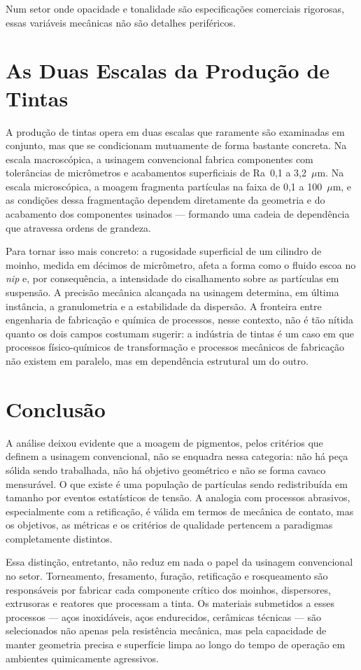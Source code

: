 \documentclass[
  12pt,
  a4paper,
  oneside,
  brazil,
  chapter=TITLE
]{article}
\newcommand{\secbreak}{\clearpage}
\let\oldsection\section
\renewcommand{\section}{\secbreak\oldsection}
\begin{document}
Num setor onde opacidade e tonalidade são especificações comerciais rigorosas,
essas variáveis mecânicas não são detalhes periféricos.

\section{As Duas Escalas da Produção de Tintas}

A produção de tintas opera em duas escalas que raramente são examinadas em
conjunto, mas que se condicionam mutuamente de forma bastante concreta. Na
escala macroscópica, a usinagem convencional fabrica componentes com
tolerâncias de micrômetros e acabamentos superficiais de Ra~0,1 a
3,2~$\mu$m. Na escala microscópica, a moagem fragmenta partículas na faixa de
0,1 a 100~$\mu$m, e as condições dessa fragmentação dependem diretamente da
geometria e do acabamento dos componentes usinados --- formando uma cadeia de
dependência que atravessa ordens de grandeza.

Para tornar isso mais concreto: a rugosidade superficial de um cilindro de
moinho, medida em décimos de micrômetro, afeta a forma como o fluido escoa no
\textit{nip} e, por consequência, a intensidade do cisalhamento sobre as
partículas em suspensão. A precisão mecânica alcançada na usinagem determina,
em última instância, a granulometria e a estabilidade da dispersão. A
fronteira entre engenharia de fabricação e química de processos, nesse
contexto, não é tão nítida quanto os dois campos costumam sugerir: a indústria
de tintas é um caso em que processos físico-químicos de transformação e
processos mecânicos de fabricação não existem em paralelo, mas em dependência
estrutural um do outro.

\section{Conclusão}

A análise deixou evidente que a moagem de pigmentos, pelos critérios que
definem a usinagem convencional, não se enquadra nessa categoria: não há peça
sólida sendo trabalhada, não há objetivo geométrico e não se forma cavaco
mensurável. O que existe é uma população de partículas sendo redistribuída em
tamanho por eventos estatísticos de tensão. A analogia com processos
abrasivos, especialmente com a retificação, é válida em termos de mecânica de
contato, mas os objetivos, as métricas e os critérios de qualidade pertencem a
paradigmas completamente distintos.

Essa distinção, entretanto, não reduz em nada o papel da usinagem convencional
no setor. Torneamento, fresamento, furação, retificação e rosqueamento são
responsáveis por fabricar cada componente crítico dos moinhos, dispersores,
extrusoras e reatores que processam a tinta. Os materiais submetidos a esses
processos --- aços inoxidáveis, aços endurecidos, cerâmicas técnicas --- são
selecionados não apenas pela resistência mecânica, mas pela capacidade de
manter geometria precisa e superfície limpa ao longo do tempo de operação em
ambientes quimicamente agressivos.
\end{document}
